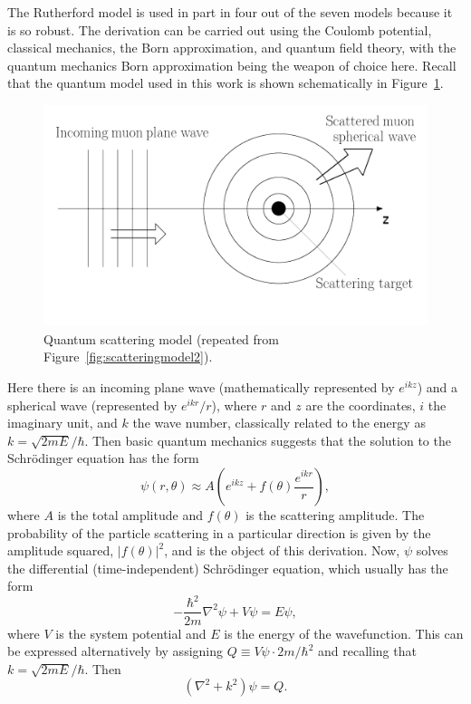 The Rutherford model is used in part in four out of the seven models because it is so robust. The derivation can be carried out using the Coulomb potential, classical mechanics, the Born approximation, and quantum field theory, with the quantum mechanics Born approximation being the weapon of choice here. Recall that the quantum model used in this work is shown schematically in Figure~\ref{fig:qmscatteringmodel}.
\begin{figure}
  \centering
    \includegraphics[width=\textwidth]{Figures/scattering_model_2} 
  \caption{Quantum scattering model (repeated from Figure~\ref{fig:scatteringmodel2}).}
  \label{fig:qmscatteringmodel}
\end{figure}
Here there is an incoming plane wave (mathematically represented by $e^{ikz}$) and a spherical wave (represented by $e^{ikr}/r$), where $r$ and $z$ are the coordinates, $i$ the imaginary unit, and $k$ the wave number, classically related to the energy as $k=\sqrt{2mE}/\hbar$. Then basic quantum mechanics suggests that the solution to the Schr\"{o}dinger equation has the form
\begin{equation}
\label{eqn:scatteringwavefunction}
\psi (r,\theta)\approx A \left(e^{ikz}+f(\theta)\frac{e^{ikr}}{r}\right),
\end{equation}
where $A$ is the total amplitude and $f(\theta)$ is the scattering amplitude. The probability of the particle scattering in a particular direction is given by the amplitude squared, $|f(\theta)|^2$, and is the object of this derivation. Now, $\psi$ solves the differential (time-independent) Schr\"{o}dinger equation, which usually has the form
\begin{equation} \nonumber
-\frac{\hbar^2}{2m}\nabla^2\psi+V\psi=E\psi,
\end{equation}
where $V$ is the system potential and $E$ is the energy of the wavefunction. This can be expressed alternatively by assigning $Q\equiv V\psi\cdot{2m}/{\hbar^2}$ and recalling that $k=\sqrt{2mE}/\hbar$. Then
%
\begin{equation}
\label{eqn:schrodinger}
(\nabla^2+k^2)\psi=Q.
\end{equation}


